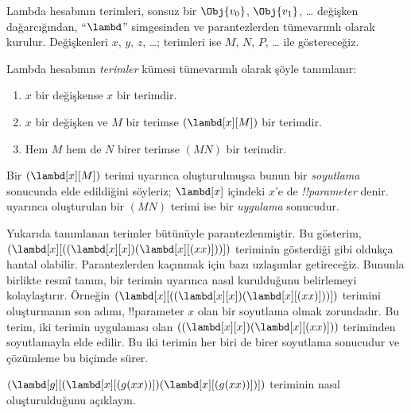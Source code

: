 


Lambda hesabının terimleri, sonsuz bir $\Obj{v_0}$, $\Obj{v_1}$, \dots{}
değişken dağarcığından, ``$\lambd$'' simgesinden ve parantezlerden
tümevarımlı olarak kurulur. Değişkenleri $x$, $y$, $z$, \dots{}; terimleri
ise $M$, $N$, $P$, \dots{} ile göstereceğiz.

\begin{defn}[Terimler] 
Lambda hesabının \emph{terimler} kümesi tümevarımlı olarak şöyle tanımlanır:
\begin{enumerate}
  \item {} $x$ bir değişkense $x$ bir terimdir.
  \item {} $x$ bir değişken ve $M$ bir terimse
    $(\lambd[x][M])$ bir terimdir.
  \item {} Hem $M$ hem de $N$ birer terimse $(MN)$ bir
    terimdir.
\end{enumerate}
\end{defn}

Bir $(\lambd[x][M])$ terimi  uyarınca oluşturulmuşsa
bunun bir \emph{soyutlama} sonucunda elde edildiğini söyleriz; $\lambd[x]$
içindeki $x$'e de \emph{!!{parameter}} denir.  uyarınca
oluşturulan bir $(MN)$ terimi ise bir \emph{uygulama} sonucudur.

Yukarıda tanımlanan terimler bütünüyle parantezlenmiştir. Bu gösterim,
$(\lambd[x][((\lambd[x][x])(\lambd[x][(xx)]))])$ teriminin gösterdiği gibi
oldukça hantal olabilir. Parantezlerden kaçınmak için bazı uzlaşımlar
getireceğiz. Bununla birlikte resmî tanım, bir terimin 
uyarınca nasıl kurulduğunu belirlemeyi kolaylaştırır. Örneğin
$(\lambd[x][((\lambd[x][x])(\lambd[x][(xx)]))])$ terimini oluşturmanın son
adımı, !!{parameter} $x$ olan bir soyutlama olmak zorundadır. Bu terim,
iki terimin uygulaması olan
$((\lambd[x][x])(\lambd[x][(xx)]))$ teriminden soyutlamayla elde edilir.
Bu iki terimin her biri de birer soyutlama sonucudur ve çözümleme bu biçimde
sürer.

\begin{prob}
$(\lambd[g][(\lambd[x][(g (x x))])
  (\lambd[x][(g (x x))])])$ teriminin nasıl oluşturulduğunu açıklayın.
\end{prob}

